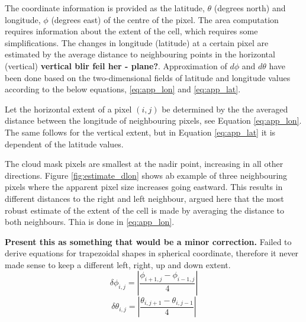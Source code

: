 The coordinate information is provided as the latitude, $\theta$ (degrees north) and longitude, $\phi$ (degrees east) of the centre of the pixel. The area computation requires information about the extent of the cell, which requires some simplifications. The changes in longitude (latitude) at a certain pixel are estimated by the average distance to neighbouring points in the horizontal (vertical) \textbf{vertical blir feil her - plane?}. Approximation of $d\phi$ and $d\theta$ have been done based on the two-dimensional fields of latitude and longitude values according to the below equations, \eqref{eq:app_lon} and  \eqref{eq:app_lat}. 

Let the horizontal extent of a pixel $(i,j)$ be determined by the the averaged distance between the longitude of neighbouring pixels, see Equation \eqref{eq:app_lon}. The same follows for the vertical extent, but in Equation \eqref{eq:app_lat} it is dependent of the latitude values. 

The cloud mask pixels are smallest at the nadir point, increasing in all other directions. Figure \ref{fig:estimate_dlon} shows ab example of three neighbouring pixels where the apparent pixel size increases going eastward. This results in different distances to the right and left neighbour, argued here that the most robust estimate of the extent of the cell is made by averaging the distance to both neighbours. Thia is done in \eqref{eq:app_lon}. 

\textbf{Present this as something that would be a minor correction.}
Failed to derive equations for trapezoidal shapes in spherical coordinate, therefore it never made sense to keep a different left, right, up and down extent. 
\begin{equation} \label{eq:app_lon}
    \delta \phi_{i,j} = \left| \frac{\phi_{i+1,j} - \phi_{i-1, j}}{4} \right|
\end{equation}
\begin{equation} \label{eq:app_lat}
    \delta \theta_{i,j} = \left| \frac{\theta_{i,j+1} - \theta_{i, j-1}}{4} \right|
\end{equation}

